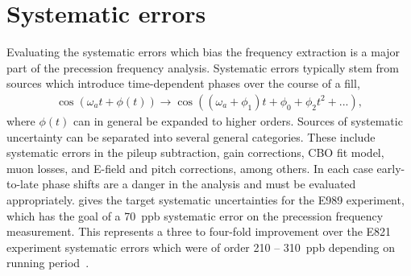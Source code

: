 
\thispagestyle{myheadings}

\graphicspath{{Body/Figures/Wa/Datasets/Endgame/LostMuonFiles/MainCuts/}{Body/Figures/Wa/Datasets/ComparisonPlots/LostMuons/}{Body/Figures/Wa/Datasets/9d/SingleIteration/LostMuonFits/}{Body/Figures/Wa/Datasets/9d/PileupJobs/PileupGapTime/}{Body/Figures/Wa/Datasets/9d/PileupJobs/PileupDeadTime/auto-scaling/}{Body/Figures/Wa/Datasets/9d/PileupJobs/PileupDeadTime/fixed-scaling/}{Body/Figures/Wa/Datasets/9d/PileupJobs/PileupEnergyScale/}{Body/Figures/Wa/Datasets/9d/PileupJobs/PileupTimeShift/}{Body/Figures/Wa/Datasets/9d/SingleIteration/PileupMultiplierScan/}{Body/Figures/Wa/Datasets/60h/RatioConstruction/Ta/}{Body/Figures/Wa/Datasets/60h/RatioConstruction/TauMu/}{Body/Figures/Wa/Datasets/9d/Binning/BinEdge/}{Body/Figures/Wa/Datasets/9d/Binning/BinWidth/}{Body/Figures/Wa/Datasets/60h/Gain/0p25-steps/}{Body/Figures/Wa/Datasets/60h/Gain/Lifetime/}{Body/Figures/Wa/Datasets/ComparisonPlots/}}




\section{Systematic errors}
\label{sec:SystematicErrors}


Evaluating the systematic errors which bias the \wa frequency extraction is a major part of the precession frequency analysis. Systematic errors typically stem from sources which introduce time-dependent phases over the course of a fill,
    \begin{align} \label{eq:timeDependentPhase}
        \cos{(\omega_{a}t + \phi(t))} \rightarrow \cos{((\omega_{a}+\phi_{1})t + \phi_{0} + \phi_{2}t^{2} + ...)},
    \end{align}
where $\phi(t)$ can in general be expanded to higher orders. Sources of systematic uncertainty can be separated into several general categories. These include systematic errors in the pileup subtraction, gain corrections, CBO fit model, muon losses, and E-field and pitch corrections, among others. In each case early-to-late phase shifts are a danger in the analysis and must be evaluated appropriately.  gives the target systematic uncertainties for the E989 experiment, which has the goal of a \SI{70}{ppb} systematic error on the precession frequency measurement. This represents a three to four-fold improvement over the E821 experiment systematic errors which were of order \SI{210}{} -- \SI{310}{ppb} depending on running period~\cite{E821FinalReport}.

